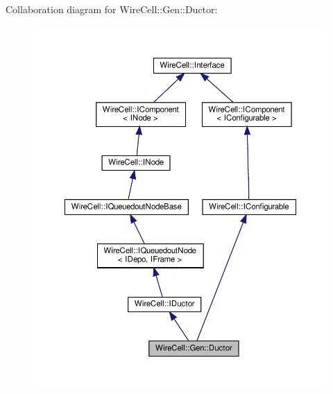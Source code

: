 Collaboration diagram for Wire\+Cell\+:\+:Gen\+:\+:Ductor\+:
\nopagebreak
\begin{figure}[H]
\begin{center}
\leavevmode
\includegraphics[width=350pt]{class_wire_cell_1_1_gen_1_1_ductor__coll__graph}
\end{center}
\end{figure}

